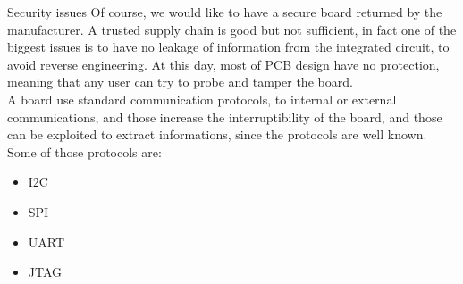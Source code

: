 \begin{section}{Security issues}
  Of course, we would like to have a secure board returned by the manufacturer. A trusted supply
  chain is good but not sufficient, in fact one of the biggest issues is to have no leakage of
  information from the integrated circuit, to avoid reverse engineering. At this day, most of PCB
  design have no protection, meaning that any user can try to probe and tamper the board.\\ 
  A board use standard communication protocols, to internal or external communications, and those
  increase the interruptibility of the board, and those can be exploited to extract informations,
  since the protocols are well known. Some of those protocols are:
  \begin{itemize}
    \item I2C
    \item SPI
    \item UART
    \item JTAG
  \end{itemize}
\end{section}

